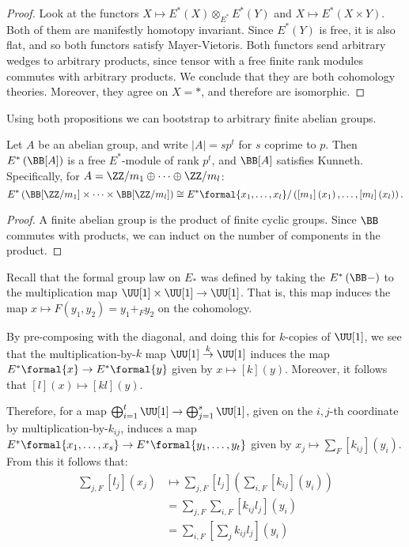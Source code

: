 \begin{proof}
	Look at the functors $X \mapsto E^*\left(X\right) \otimes_{E^*} E^*\left(Y\right)$ and $X \mapsto E^*\left(X \times Y\right)$.
	Both of them are manifestly homotopy invariant.
	Since $E^*\left(Y\right)$ is free, it is also flat, and so both functors satisfy Mayer-Vietoris.
	Both functors send arbitrary wedges to arbitrary products, since tensor with a free finite rank modules commutes with arbitrary products.
	We conclude that they are both cohomology theories.
	Moreover, they agree on $X = *$, and therefore are isomorphic.
\end{proof}

Using both propositions we can bootstrap to arbitrary finite abelian groups.

\begin{proposition}\label{E-B-abelian}
	Let $A$ be an abelian group, and write $\left|A\right| = sp^t$ for $s$ coprime to $p$.
	Then $E^*\left(\BB[A]\right)$ is a free $E^*$-module of rank $p^t$, and $\BB[A]$ satisfies Kunneth.
	Specifically, for $A = \ZZ/m_1 \oplus \cdots \oplus \ZZ/m_l$:
	$$
	E^*\left(\BB[\ZZ/m_1] \times \cdots \times \BB[\ZZ/m_l]\right)
	\cong E^*\formal{x_1, \dotsc, x_l}/\left(\left[m_1\right]\left(x_1\right), \dotsc, \left[m_l\right]\left(x_l\right)\right).
	$$
\end{proposition}

\begin{proof}
	A finite abelian group is the product of finite cyclic groups.
	Since $\BB$ commutes with products, we can induct on the number of components in the product.
\end{proof}


Recall that the formal group law on $E_*$ was defined by taking the $E^*\left(\BB-\right)$ to the multiplication map $\UU[1] \times \UU[1] \to \UU[1]$.
That is, this map induces the map $x \mapsto F\left(y_1, y_2\right) = y_1 +_F y_2$ on the cohomology.

By pre-composing with the diagonal, and doing this for $k$-copies of $\UU[1]$, we see that the multiplication-by-$k$ map $\UU[1] \overset{k}{\to} \UU[1]$ induces the map $E^*\formal{x} \to E^*\formal{y}$ given by $x \mapsto \left[k\right]\left(y\right)$.
Moreover, it follows that $\left[l\right]\left(x\right) \mapsto \left[kl\right]\left(y\right)$.

Therefore, for a map $\bigoplus_{i=1}^t \UU[1] \to \bigoplus_{j=1}^s \UU[1]$, given on the $i,j$-th coordinate by multiplication-by-$k_{ij}$, induces a map
$E^*\formal{x_1, \dotsc, x_s} \to E^*\formal{y_1, \dotsc, y_t}$
given by $x_j \mapsto \sum_F\left[k_{ij}\right]\left(y_i\right)$.
From this it follows that:
\begin{align*}
	\sum_{j,F}\left[l_j\right]\left(x_j\right)
	&\mapsto \sum_{j,F}\left[l_j\right]\left(\sum_{i,F}\left[k_{ij}\right]\left(y_i\right)\right)\\
	&= \sum_{j,F}\sum_{i,F}\left[k_{ij} l_j\right]\left(y_i\right)\\
	&= \sum_{i,F}\left[\sum_j k_{ij} l_j\right]\left(y_i\right)
\end{align*}

